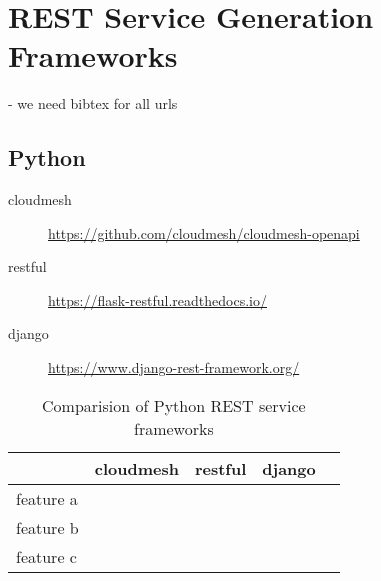 \section{REST Service Generation Frameworks}

- we need bibtex for all urls

\subsection{Python}

\begin{description}

\item[cloudmesh]

\url{https://github.com/cloudmesh/cloudmesh-openapi} 

\item[restful]

\url{https://flask-restful.readthedocs.io/}

\item[django] \url{https://www.django-rest-framework.org/}

\end{description}

\begin{table}[htb]

\caption{Comparision of Python REST service frameworks}

\begin{tabular}{|l|l|l|l|l|}
\hline

 & cloudmesh &  restful &  django &  \\ \hline
 feature a &  &  &  &  \\ \hline
 feature b &  &  &  &  \\ \hline
 feature c &  &  &  &  \\ \hline
\end{tabular}

\end{table}
